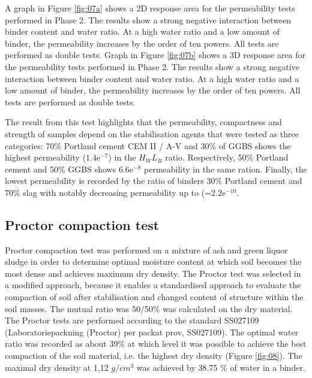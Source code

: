 \documentclass{amestyle}
\begin{document}
A graph in Figure \ref{fig:07a} shows a 2D response area for the permeability tests performed in Phase 2. The results show a strong negative interaction between binder content and water ratio. At a high water ratio and a low amount of binder, the permeability increases by the order of ten powers. All tests are performed as double tests. Graph in Figure \ref{fig:07b} shows a 3D response area for the permeability tests performed in Phase 2. The results show a strong negative interaction between binder content and water ratio. At a high water ratio and a low amount of binder, the permeability increases by the order of ten powers. All tests are performed as double tests.

The result from this test highlights that the permeability, compactness and strength of samples depend on the stabilisation agents that were tested as three categories: 70\% Portland cement CEM II / A-V  and 30\% of GGBS shows the highest permeability ($1.4\mathrm{e}^{-7}$) in the $H_WL_B$ ratio. Respectively, 50\% Portland cement and 50\% GGBS shows $6.6\mathrm{e}^{-8}$ permeability in the same ration. Finally, the lowest permeability is recorded by the ratio of binders 30\% Portland cement and 70\% slag with notably decreasing permeability up to (=$2.2\mathrm{e}^{-10}$. 

\subsection{Proctor compaction test}
Proctor compaction test was performed on a mixture of ash and green liquor sludge in order to determine optimal moisture content at which soil becomes the most dense and achieves maximum dry density. The Proctor test was selected in a modified approach, because it enables a standardised approach to evaluate the compaction of soil after stabilisation and changed content of structure within the soil masses. The mutual ratio was 50/50\% was calculated on the dry material. The Proctor tests are performed according to the standard SS027109 (Laboratoriepackning (Proctor) per packat prov, SS027109). The optimal water ratio was recorded as about 39\% at which level it was possible to achieve the best compaction of the soil material, i.e. the highest dry density (Figure \ref{fig:08}). The maximal dry density at 1,12 $g/cm^3$ was achieved by 38.75 \% of water in a binder. 
\end{document}
